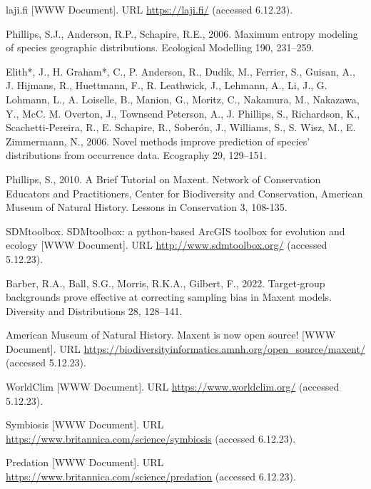 \documentclass{article}
\begin{document}
\begin{thebibliography}{11}
	laji.fi [WWW Document]. URL \url{https://laji.fi/} (accessed 6.12.23).
	
	Phillips, S.J., Anderson, R.P., Schapire, R.E., 2006. Maximum entropy modeling of species geographic distributions. Ecological Modelling 190, 231–259.
	
	Elith*, J., H. Graham*, C., P. Anderson, R., Dudík, M., Ferrier, S., Guisan, A., J. Hijmans, R., Huettmann, F., R. Leathwick, J., Lehmann, A., Li, J., G. Lohmann, L., A. Loiselle, B., Manion, G., Moritz, C., Nakamura, M., Nakazawa, Y., McC. M. Overton, J., Townsend Peterson, A., J. Phillips, S., Richardson, K., Scachetti‐Pereira, R., E. Schapire, R., Soberón, J., Williams, S., S. Wisz, M., E. Zimmermann, N., 2006. Novel methods improve prediction of species’ distributions from occurrence data. Ecography 29, 129–151.
	
	Phillips, S., 2010. A Brief Tutorial on Maxent. Network of Conservation Educators and Practitioners, Center for Biodiversity and Conservation, American Museum of Natural History. Lessons in Conservation 3, 108-135.
	
	SDMtoolbox. SDMtoolbox: a python-based ArcGIS toolbox for evolution and ecology [WWW Document]. URL \url{http://www.sdmtoolbox.org/} (accessed 5.12.23).
	
	Barber, R.A., Ball, S.G., Morris, R.K.A., Gilbert, F., 2022. Target‐group backgrounds prove effective at correcting sampling bias in Maxent models. Diversity and Distributions 28, 128–141.
	
	American Museum of Natural History. Maxent is now open source! [WWW Document]. URL \url{https://biodiversityinformatics.amnh.org/open_source/maxent/} (accessed 5.12.23).
	
	WorldClim [WWW Document]. URL \url{https://www.worldclim.org/} (accessed 5.12.23).
	
	Symbiosis [WWW Document]. URL \url{https://www.britannica.com/science/symbiosis} (accessed 6.12.23).
	
	Predation [WWW Document]. URL \url{https://www.britannica.com/science/predation} (accessed 6.12.23).
\end{thebibliography}
\end{document}
